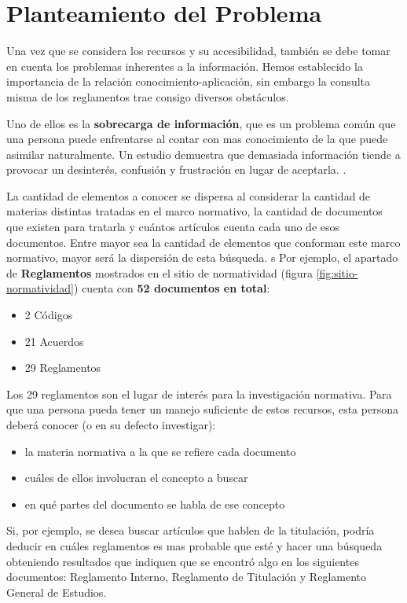 \section{Planteamiento del Problema}

Una vez que se considera los recursos y su accesibilidad, también se debe tomar en cuenta los problemas inherentes a la información. Hemos establecido la importancia de la relación conocimiento-aplicación, sin embargo la consulta misma de los reglamentos trae consigo diversos obstáculos.

Uno de ellos es la \textbf{sobrecarga de información}, que es un problema común que una persona puede enfrentarse al contar con mas conocimiento de la que puede asimilar naturalmente. Un estudio demuestra que demasiada información tiende a provocar un desinterés, confusión y frustración en lugar de aceptarla. \parencite{jinwonrong}. 

La cantidad de elementos a conocer se dispersa al considerar la cantidad de materias distintas tratadas en el marco normativo, la cantidad de documentos que existen para tratarla y cuántos artículos cuenta cada uno de esos documentos. Entre mayor sea la cantidad de elementos que conforman este marco normativo, mayor será la dispersión de esta búsqueda.
s
Por ejemplo, el apartado de \textbf{Reglamentos} mostrados en el sitio de normatividad (figura \ref{fig:sitio-normatividad}) cuenta con \textbf{52 documentos en total}:
\begin{itemize}
    \item 2 Códigos
    \item 21 Acuerdos
    \item 29 Reglamentos
\end{itemize}

Los 29 reglamentos son el lugar de interés para la investigación normativa. Para que una persona pueda tener un manejo suficiente de estos recursos, esta persona deberá conocer (o en su defecto investigar):

\begin{itemize}
    \item la materia normativa a la que se refiere cada documento
    \item cuáles de ellos involucran el concepto a buscar
    \item en qué partes del documento se habla de ese concepto
\end{itemize}

Si, por ejemplo, se desea buscar artículos que hablen de la titulación, podría deducir en cuáles reglamentos es mas probable que esté y hacer una búsqueda obteniendo resultados que indiquen que se encontró algo en los siguientes documentos: Reglamento Interno, Reglamento de Titulación y Reglamento General de Estudios.

